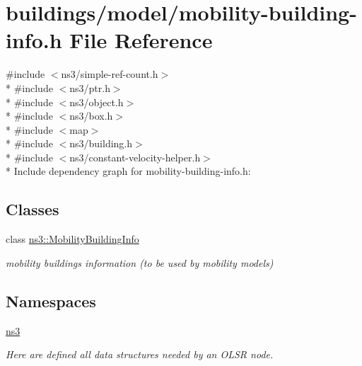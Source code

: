 \hypertarget{mobility-building-info_8h}{}\section{buildings/model/mobility-\/building-\/info.h File Reference}
\label{mobility-building-info_8h}
{\ttfamily \#include $<$ns3/simple-\/ref-\/count.\+h$>$}\\*
{\ttfamily \#include $<$ns3/ptr.\+h$>$}\\*
{\ttfamily \#include $<$ns3/object.\+h$>$}\\*
{\ttfamily \#include $<$ns3/box.\+h$>$}\\*
{\ttfamily \#include $<$map$>$}\\*
{\ttfamily \#include $<$ns3/building.\+h$>$}\\*
{\ttfamily \#include $<$ns3/constant-\/velocity-\/helper.\+h$>$}\\*
Include dependency graph for mobility-\/building-\/info.h\+:
\subsection*{Classes}
\begin{DoxyCompactItemize}
\item 
class \hyperlink{classns3_1_1MobilityBuildingInfo}{ns3\+::\+Mobility\+Building\+Info}
\begin{DoxyCompactList}\small\item\em mobility buildings information (to be used by mobility models) \end{DoxyCompactList}\end{DoxyCompactItemize}
\subsection*{Namespaces}
\begin{DoxyCompactItemize}
\item 
 \hyperlink{namespacens3}{ns3}
\begin{DoxyCompactList}\small\item\em Here are defined all data structures needed by an O\+L\+SR node. \end{DoxyCompactList}\end{DoxyCompactItemize}
